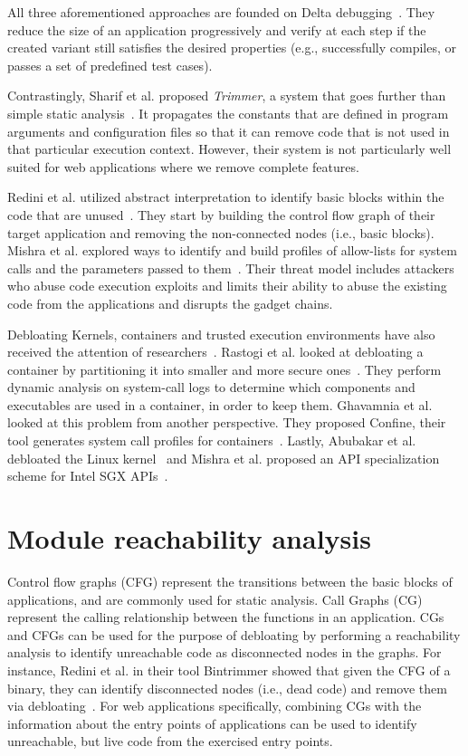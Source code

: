 All three aforementioned approaches are founded on Delta debugging~\cite{zeller2002Delta}.
They reduce the size of an application progressively and verify at each step if the created variant still satisfies the desired properties (e.g., successfully compiles, or passes a set of predefined test cases).

Contrastingly, Sharif et al. proposed \textit{Trimmer}, a system that goes further than simple static analysis~\cite{sharif2018Trimmer}.
It propagates the constants that are defined in program arguments and configuration files so that it can remove code that is not used in that particular execution context.
However, their system is not particularly well suited for web applications where we remove complete features.

Redini et al. utilized abstract interpretation to identify basic blocks within the code that are unused~\cite{redini2019b}. 
They start by building the control flow graph of their target application and removing the non-connected nodes (i.e., basic blocks). 
Mishra et al. explored ways to identify and build profiles of allow-lists for system calls and the parameters passed to them~\cite{mishra2018shredder,mishra2020saffire}. 
Their threat model includes attackers who abuse code execution exploits and limits their ability to abuse the existing code from the applications and disrupts the gadget chains. 

Debloating Kernels, containers and trusted execution environments have also received the attention of researchers~\cite{abubakar2021shard,mishra2021sgxpecial}. 
Rastogi et al. looked at debloating a container by partitioning it into smaller and more secure ones~\cite{rastogi2017Cimplifier}. They perform dynamic analysis on system-call logs to determine which components and executables are used in a container, in order to keep them. 
Ghavamnia et al. looked at this problem from another perspective. 
They proposed Confine, their tool generates system call profiles for containers~\cite{259711}.
Lastly, Abubakar et al. debloated the Linux kernel~\cite{abubakar2021shard} and Mishra et al. proposed an API specialization scheme for Intel SGX APIs~\cite{mishra2021sgxpecial}.

\section{Module reachability analysis}

Control flow graphs (CFG) represent the transitions between the basic blocks of applications, and are commonly used for static analysis. 
Call Graphs (CG) represent the calling relationship between the functions in an application. 
CGs and CFGs can be used for the purpose of debloating by performing a reachability analysis to identify unreachable code as disconnected nodes in the graphs. 
For instance, Redini et al. in their tool Bintrimmer showed that given the CFG of a binary, they can identify disconnected nodes (i.e., dead code) and remove them via debloating~\cite{redini2019b}. 
For web applications specifically, combining CGs with the information about the entry points of applications can be used to identify unreachable, but live code from the exercised entry points. 

